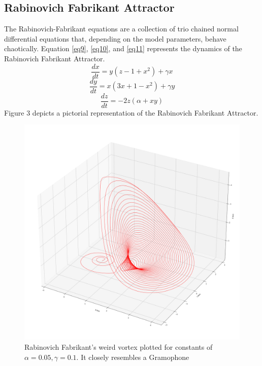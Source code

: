 \documentclass[conference]{IEEEtran}
\begin{document}
\subsection{Rabinovich Fabrikant Attractor}
The Rabinovich-Fabrikant equations are a collection of trio chained normal differential equations that, depending on the model parameters, behave chaotically. Equation \ref{eq9}, \ref{eq10}, and \ref{eq11} represents the dynamics of the Rabinovich Fabrikant Attractor. 
\begin{equation}\label{eq9}
\frac{dx}{dt}=y(z-1+x^2)+\gamma x
\end{equation}
\begin{equation}\label{eq10}
\frac{dy}{dt}=x\left(3x+1-x^2\right)+\gamma y
\end{equation}
\begin{equation}\label{eq11}
\frac{dz}{dt}=-2z\left(\alpha+xy\right)
\end{equation}
Figure 3 depicts a pictorial representation of the Rabinovich Fabrikant Attractor. 
\begin{figure}
\centerline{\includegraphics[width = \linewidth]{3.png}}
\caption{Rabinovich Fabrikant's weird vortex plotted for constants of $\alpha=0.05, \gamma=0.1$. It closely resembles a Gramophone}
\end{figure}
\end{document}
